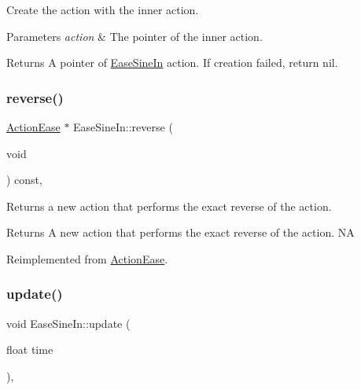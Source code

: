 Create the action with the inner action. 


\begin{DoxyParams}{Parameters}
{\em action} & The pointer of the inner action. \\
\hline
\end{DoxyParams}
\begin{DoxyReturn}{Returns}
A pointer of \hyperlink{classEaseSineIn}{Ease\+Sine\+In} action. If creation failed, return nil. 
\end{DoxyReturn}
\mbox{\label{classEaseSineIn_a1de9aa9234921476d8cbfa1a3f555c29}} 
\subsubsection{\texorpdfstring{reverse()}{reverse()}}
{\footnotesize\ttfamily \hyperlink{classActionEase}{Action\+Ease} $\ast$ Ease\+Sine\+In\+::reverse (\begin{DoxyParamCaption}\item[{void}]{ }\end{DoxyParamCaption}) const\hspace{0.3cm}{\ttfamily [override]}, {\ttfamily [virtual]}}

Returns a new action that performs the exact reverse of the action.

\begin{DoxyReturn}{Returns}
A new action that performs the exact reverse of the action.  NA 
\end{DoxyReturn}


Reimplemented from \hyperlink{classActionEase_ab99eb083fa033fae1d6c948fdc730782}{Action\+Ease}.

\mbox{\label{classEaseSineIn_aa409768eb74f38a9c8c7346f9c5243e1}} 
\subsubsection{\texorpdfstring{update()}{update()}}
{\footnotesize\ttfamily void Ease\+Sine\+In\+::update (\begin{DoxyParamCaption}\item[{float}]{time }\end{DoxyParamCaption})\hspace{0.3cm}{\ttfamily [override]}, {\ttfamily [virtual]}}

